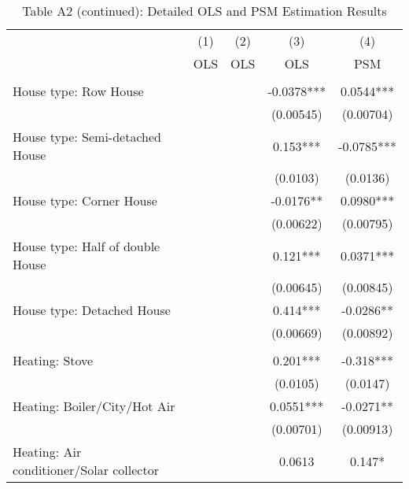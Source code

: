 \documentclass[12pt]{article}
\begin{document}
\begin{table}[H]
\scriptsize
  \centering
  \caption*{Table A2 (continued): Detailed OLS and PSM Estimation Results}
      \begin{tabular}{lcccc}
\hline
                &\multicolumn{1}{c}{(1)}&\multicolumn{1}{c}{(2)}&\multicolumn{1}{c}{(3)}&\multicolumn{1}{c}{(4)}\\
& OLS                      & OLS & OLS & PSM \\
\hline
&&&&\\
House type: Row House                       &            &             & -0.0378***  & 0.0544***    \\
                                &            &             & (0.00545)   & (0.00704)    \\
House type: Semi-detached House             &            &             & 0.153***    & -0.0785***   \\
                                &            &             & (0.0103)    & (0.0136)     \\
House type: Corner House                    &            &             & -0.0176**   & 0.0980***    \\
                                &            &             & (0.00622)   & (0.00795)    \\
House type: Half of double House            &            &             & 0.121***    & 0.0371***    \\
                                &            &             & (0.00645)   & (0.00845)    \\
House type: Detached House                  &            &             & 0.414***    & -0.0286**    \\
                                &            &             & (0.00669)   & (0.00892)    \\
&&&&\\
Heating: Stove                           &            &             & 0.201***    & -0.318***    \\
                                &            &             & (0.0105)    & (0.0147)     \\
Heating: Boiler/City/Hot Air             &            &             & 0.0551***   & -0.0271**    \\
                                &            &             & (0.00701)   & (0.00913)    \\
Heating: Air conditioner/Solar collector &            &             & 0.0613      & 0.147*       \\

\end{tabular}
\end{table}
\end{document}
